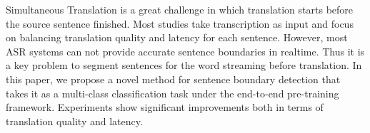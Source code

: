 Simultaneous Translation is a great challenge in which translation starts before the source sentence finished. Most studies take transcription as input and focus on balancing translation quality and latency for each sentence. However, most ASR systems can not provide accurate sentence boundaries in realtime. Thus it is a key problem to segment sentences for the word streaming before translation. In this paper, we propose a novel method for sentence boundary detection that takes it as a multi-class classification task under the end-to-end pre-training framework. Experiments show significant improvements both in terms of translation quality and latency.
